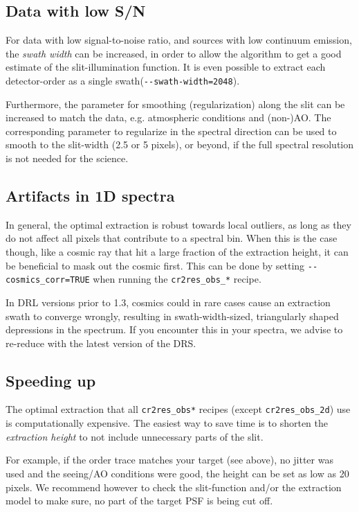 \subsection{Data with low S/N}
For data with low signal-to-noise ratio, and sources with low continuum
emission, the \emph{swath width} can be increased, in order to allow the
algorithm to get a good estimate of the slit-illumination function. It is even
possible to extract each detector-order as a single
swath(\verb!--swath-width=2048!).
 
Furthermore, the parameter for smoothing (regularization) along the slit can be
increased to match the data, e.g. atmospheric conditions and (non-)AO. The
corresponding parameter to regularize in the spectral direction can be used to
smooth to the slit-width (2.5 or 5 pixels), or beyond, if the full spectral
resolution is not needed for the science.

\subsection{Artifacts in 1D spectra}
In general, the optimal extraction is robust towards local outliers, as long as
they do not affect all pixels that contribute to a spectral bin. When this is
the case though, like a cosmic ray that hit a large fraction of the extraction
height, it can be beneficial to mask out the cosmic first. This can be done by
setting \verb!--cosmics_corr=TRUE! when running the \verb!cr2res_obs_*! recipe.

In DRL versions prior to 1.3, cosmics could in rare cases cause an extraction
swath to converge wrongly, resulting in swath-width-sized, triangularly shaped
depressions in the spectrum. If you encounter this in your spectra, we advise to
re-reduce with the latest version of the DRS.

\subsection{Speeding up}
The optimal extraction that all \verb!cr2res_obs*! recipes (except
\verb!cr2res_obs_2d!) use is computationally expensive. The easiest way to save
time is to shorten the \emph{extraction height} to not include unnecessary parts
of the slit. 

For example, if the order trace matches your target (see above), no jitter was
used and the seeing/AO conditions were good, the height can be set as low as 20
pixels. We recommend however to check the slit-function and/or the extraction
model to make sure, no part of the target PSF is being cut off.

